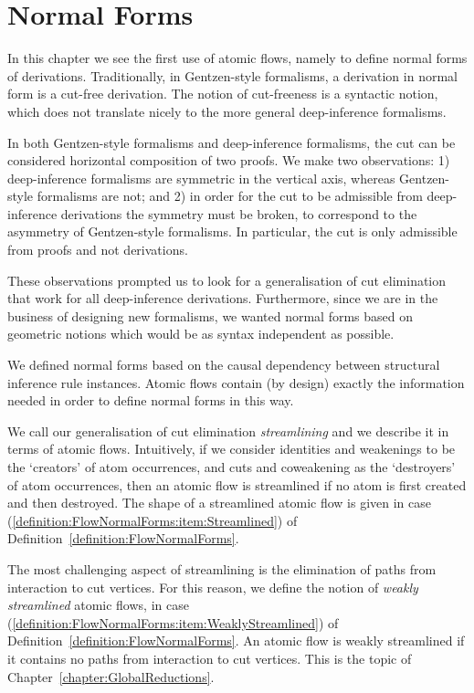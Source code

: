\chapter{Normal Forms}\label{chapter:NormalForms}

In this chapter we see the first use of atomic flows, namely to define normal forms of derivations. Traditionally, in Gentzen-style formalisms, a derivation in normal form is a cut-free derivation. The notion of cut-freeness is a syntactic notion, which does not translate nicely to the more general deep-inference formalisms.

In both Gentzen-style formalisms and deep-inference formalisms, the cut can be considered horizontal composition of two proofs. We make two observations: 1) deep-inference formalisms are symmetric in the vertical axis, whereas Gentzen-style formalisms are not; and 2) in order for the cut to be admissible from deep-inference derivations the symmetry must be broken, to correspond to the asymmetry of Gentzen-style formalisms. In particular, the cut is only admissible from proofs and not derivations.

These observations prompted us to look for a generalisation of cut elimination that work for all deep-inference derivations. Furthermore, since we are in the business of designing new formalisms, we wanted normal forms based on geometric notions which would be as syntax independent as possible.

We defined normal forms based on the causal dependency between structural inference rule instances. Atomic flows contain (by design) exactly the information needed in order to define normal forms in this way.

We call our generalisation of cut elimination \emph{streamlining} and we describe it in terms of atomic flows. Intuitively, if we consider identities and weakenings to be the `creators' of atom occurrences, and cuts and coweakening as the `destroyers' of atom occurrences, then an atomic flow is streamlined if no atom is first created and then destroyed. The shape of a streamlined atomic flow is given in case (\ref{definition:FlowNormalForms:item:Streamlined}) of Definition~\vref{definition:FlowNormalForms}.

The most challenging aspect of streamlining is the elimination of paths from interaction to cut vertices. For this reason, we define the notion of \emph{weakly streamlined} atomic flows, in case (\ref{definition:FlowNormalForms:item:WeaklyStreamlined}) of Definition~\ref{definition:FlowNormalForms}. An atomic flow is weakly streamlined if it contains no paths from interaction to cut vertices. This is the topic of Chapter~\vref{chapter:GlobalReductions}.


